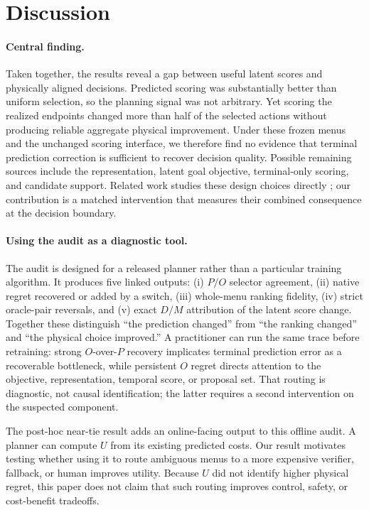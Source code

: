 \documentclass[letterpaper,10pt,conference]{ieeeconf}
\begin{document}
\section{Discussion}

\paragraph{Central finding.}
Taken together, the results reveal a gap between useful latent scores and
physically aligned decisions. Predicted scoring was substantially better than
uniform selection, so the planning signal was not arbitrary. Yet scoring the
realized endpoints changed more than half of the selected actions without
producing reliable aggregate physical improvement. Under these frozen menus and
the unchanged scoring interface, we therefore find no evidence that terminal
prediction correction is sufficient to recover decision quality. Possible
remaining sources include the representation, latent goal objective,
terminal-only scoring, and candidate support. Related work studies these design
choices directly \cite{singh2026objective,vesessook2026hidden}; our contribution
is a matched intervention that measures their combined consequence at the
decision boundary.

\paragraph{Using the audit as a diagnostic tool.}
The audit is designed for a released planner rather than a particular training
algorithm. It produces five linked outputs: (i) $P/O$ selector agreement,
(ii) native regret recovered or added by a switch, (iii) whole-menu ranking
fidelity, (iv) strict oracle-pair reversals, and (v) exact $D/M$ attribution of
the latent score change. Together these distinguish ``the prediction changed''
from ``the ranking changed'' and ``the physical choice improved.'' A practitioner
can run the same trace before retraining: strong $O$-over-$P$ recovery implicates
terminal prediction error as a recoverable bottleneck, while persistent $O$
regret directs attention to the objective, representation, temporal score, or
proposal set. That routing is diagnostic, not causal identification; the latter
requires a second intervention on the suspected component.

The post-hoc near-tie result adds an online-facing output to this offline audit.
A planner can compute $U$ from its existing predicted costs. Our result motivates
testing whether using it to route ambiguous menus to a more expensive verifier,
fallback, or human improves utility. Because $U$ did not identify higher
physical regret, this paper does not claim that such routing improves control,
safety, or cost-benefit tradeoffs.
\end{document}
